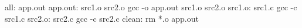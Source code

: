 all: app.out
app.out: src1.o src2.o 
	gcc -o app.out src1.o src2.o 
src1.o: src1.c
	gcc -c src1.c
src2.o: src2.c
	gcc -c src2.c
clean:
	rm *.o app.out
